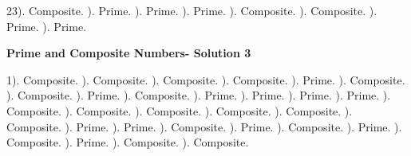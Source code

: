 \documentclass{article}%
\begin{document}
23). Composite.%
). Prime.%
). Prime.%
). Prime.%
). Composite.%
). Composite.%
). Prime.%
). Prime.%
\newline%
\newpage%
\large%
\begin{center}%
\textbf{Prime and Composite Numbers- Solution 3}%
\newline%
\end{center} \normalsize%
1). Composite.%
). Composite.%
). Composite.%
). Composite.%
). Prime.%
). Composite.%
). Composite.%
). Prime.%
). Composite.%
). Prime.%
). Prime.%
). Prime.%
). Prime.%
). Composite.%
). Composite.%
). Composite.%
). Composite.%
). Composite.%
). Composite.%
). Prime.%
). Prime.%
). Composite.%
). Prime.%
). Composite.%
). Prime.%
). Composite.%
). Prime.%
). Composite.%
). Composite.%
\newline%
\end{document}
